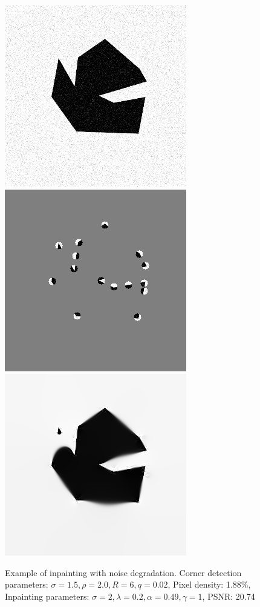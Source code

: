 \begin{figure}[ht]
    \centering
    \includegraphics[width=0.29\linewidth]{../../images/binary/abstract1_less_noise.png}
    \includegraphics[width=0.29\linewidth]{../Images/abstract/abstract1_less_noise-mask.png}
    \includegraphics[width=0.29\linewidth]{../Images/abstract/abstract1_less_noise-inpaint.png}
    \caption{Example of inpainting with noise degradation. Corner detection parameters:
    $\sigma=1.5,\rho=2.0,R=6,q=0.02$, Pixel density: 1.88\%, Inpainting parameters:
$\sigma=2,\lambda=0.2,\alpha=0.49,\gamma=1$, PSNR\@: 20.74}\label{fig:AbstractNoise1}
\end{figure}
